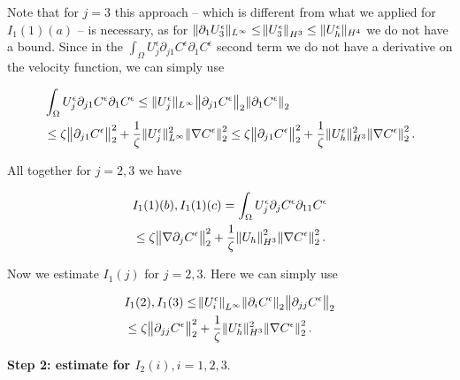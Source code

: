 \documentclass[11pt]{article}
\begin{document}
Note that for $j=3$ this approach -- which is different from what we applied for $I_1(1)(a)$ -- is necessary, as for $\| \partial_1 U_3^\epsilon \| _ {L^\infty} \leq \norm{U_3^\epsilon}_{H^3} \leq \| U_h^\epsilon \| _{H^4}$ we do not have a bound. Since in the $\int_\Omega U_j^\epsilon \partial_{j1} C^\epsilon \partial_1 C^\epsilon$ second term we do not have a derivative on the velocity function, we can simply use

\begin{equation} \nonumber
  \begin{split}
    & \int_\Omega U_j^\epsilon \partial_{j1} C^\epsilon \partial_1 C^\epsilon \leq \| U_j^\epsilon \| _{L^\infty} \norm{\partial_{j1} C^\epsilon}_2 \norm{\partial_1 C^\epsilon}_2 \\
    &  \leq \zeta \norm{\partial_{j1} C^\epsilon}_2^2 +  \frac{1}{\zeta} \| U_j^\epsilon \| _{L^\infty}^2 \norm{\nabla C^\epsilon}_2^2 \leq \zeta \norm{\partial_{j1} C^\epsilon}_2^2 +  \frac{1}{\zeta} \| U_h^\epsilon \| _{H^3}^2 \norm{\nabla C^\epsilon}_2^2. 
  \end{split}
\end{equation}

All together for $j = 2,3$ we have

\begin{equation}
  \begin{split}
    & I_1(1)(b), I_1(1)(c) = \int_\Omega U_j^\epsilon \partial_j C^\epsilon \partial_{11} C^\epsilon \\
    & \leq \zeta \norm{\nabla \partial_j C^\epsilon}_2^2 + \frac{1}{\zeta} \norm{U_h}_{H^3}^2 \norm{\nabla C^\epsilon}_2^2.
  \end{split}
\end{equation}

Now we estimate $I_1(j)$ for $j = 2,3.$ Here we can simply use

\begin{equation}
  \begin{split}
    & I_1(2), I_1(3) \leq \norm{U_i^\epsilon}_{L^\infty} \norm{\partial_i C^\epsilon}_2 \norm{\partial_{jj}C^\epsilon}_2 \\
    & \leq \zeta \norm{\partial_{jj} C^\epsilon}_2^2 + \frac{1}{\zeta} \| U_h^\epsilon \| _ {H^3} ^ 2 \norm{\nabla C^\epsilon}_2^2.
  \end{split}
\end{equation}

\textbf{Step 2: estimate for $I_2(i), i=1,2,3.$}
\end{document}
